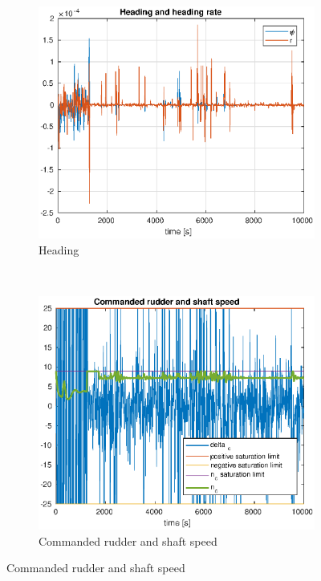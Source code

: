 \begin{figure}[ht]
	\centering
	\begin{subfigure}[b]{0.45\textwidth}
		\includegraphics[width=\textwidth]{heading1_7}
		\caption{Heading}
		\label{fig:heading1_7}
	\end{subfigure}%
	~
	\begin{subfigure}[b]{0.45\textwidth}
		\includegraphics[width=\textwidth]{rudder_shaft1_7}
		\caption{Commanded rudder and shaft speed}
		\label{fig:rudder_shaft1_7}
	\end{subfigure}%


\end{figure}
